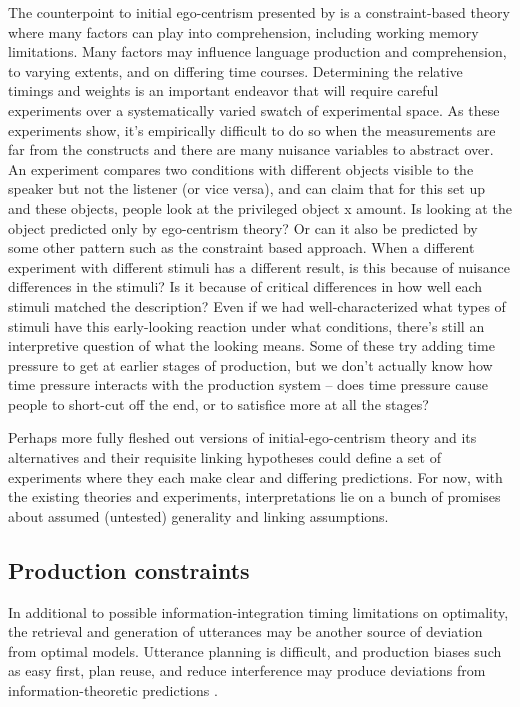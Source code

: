 \documentclass[]{article}
\begin{document}
The counterpoint to initial ego-centrism presented by \citet{hanna2003} is a constraint-based theory where many factors can play into comprehension, including working memory limitations. Many factors may influence language production and comprehension, to varying extents, and on differing time courses. Determining the relative timings and weights is an important endeavor that will require careful experiments over a systematically varied swatch of experimental space.  As these experiments show, it's empirically difficult to do so when the measurements are far from the constructs and there are many nuisance variables to abstract over. An experiment compares two conditions with different objects visible to the speaker but not the listener (or vice versa), and can claim that for this set up and these objects, people look at the privileged object x amount. Is looking at the object predicted only by ego-centrism theory? Or can it also be predicted by some other pattern such as the constraint based approach. When a different experiment with different stimuli has a different result, is this because of nuisance differences in the stimuli? Is it because of critical differences in how well each stimuli matched the description? Even if we had well-characterized what types of stimuli have this early-looking reaction under what conditions, there's still an interpretive question of what the looking means. Some of these try adding time pressure to get at earlier stages of production, but we don't actually know how time pressure interacts with the production system -- does time pressure cause people to short-cut off the end, or to satisfice more at all the stages? 

Perhaps more fully fleshed out versions of initial-ego-centrism theory and its alternatives and their requisite linking hypotheses could define a set of experiments where they each make clear and differing predictions. For now, with the existing theories and experiments, interpretations lie on a bunch of promises about assumed (untested) generality and linking assumptions. 


\subsection{Production constraints}
In additional to possible information-integration timing limitations on optimality, the retrieval and generation of utterances may be another source of deviation from optimal models. Utterance planning is difficult, and production biases such as easy first, plan reuse, and reduce interference may produce deviations from information-theoretic predictions \citep{macdonald2013}.
\end{document}
